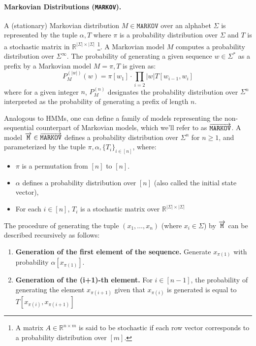 \paragraph{Markovian Distributions (\texttt{MARKOV}).} A (stationary) Markovian distribution $M \in \texttt{MARKOV}$ over an alphabet $\Sigma$ is represented by the tuple $\alpha, T$ where $\pi$ is a probability distribution over $\Sigma$ and $T$ is a stochastic matrix in $\mathbb{R}^{|\Sigma| \times |\Sigma|}$ \footnote{A matrix $A \in \mathbb{R}^{n \times m}$ is said to be stochastic if each row vector corresponds to a probability distribution over $[m]$.}. A Markovian model $M$ computes a probability distribution over $\Sigma^{\infty}$. The probability of generating a given sequence $w \in \Sigma^{*}$ as a prefix by a Markovian model $M = \pi, T$ is given as:
$$P_{M}^{(|w|)}(w) = \pi[w_{1}] \cdot \prod\limits_{i=2}{|w|} T[w_{i-1}, w_{i}]$$
where for a given integer  $n$, $P_{M}^{(n)}$ designates the probability distribution over $\Sigma^{n}$ interpreted as the probability of generating a prefix of length $n$. 

Analogous to HMMs, one can define a family of models representing the non-sequential counterpart of Markovian models, which we'll refer to as $\overrightarrow{\texttt{\text{MARKOV}}}$. A model $\overrightarrow{\texttt{M}}  \in \overrightarrow{\texttt{\text{MARKOV}}}$ defines a probability distribution over $\Sigma^{n}$ for $n \geq 1$, and parameterized by the tuple $\pi, \alpha, \{T_{i}\}_{i \in [n]}$, where:
\begin{itemize}
    \item $\pi$ is a permutation from $[n]$ to $[n]$.
    \item $\alpha$ defines a probability distribution over $[n]$ (also called the initial state vector),
    \item For each $i \in [n]$, $T_{i}$ is a stochastic matrix over $\mathbb{R}^{|\Sigma| \times |\Sigma|}$
\end{itemize}

The procedure of generating the tuple $(x_{1}, \ldots, x_{n})$ (where $x_{i} \in \Sigma$) by $\overrightarrow{\texttt{M}}$ can be described recursively as follows:
 \begin{enumerate}
     \item \textbf{Generation of the first element of the sequence.} Generate $x_{\pi(1)}$ with probability $\alpha[x_{\pi(1)}]$.
     \item \textbf{Generation of the (i+1)-th element.} For $i \in [n-1]$, the probability of generating the element $x_{\pi(i+1)}$ given that $x_{\pi(i)}$ is generated is equal to $T[x_{\pi(i)}, x_{\pi(i+1)}]$
 \end{enumerate}
  


